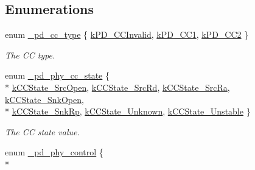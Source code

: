 \subsection*{Enumerations}
\begin{DoxyCompactItemize}
\item 
enum \hyperlink{group__usb__pd__phy__drv_gab23c0fba94b457218944bc5284d0d08d}{\-\_\-pd\-\_\-cc\-\_\-type} \{ \hyperlink{group__usb__pd__phy__drv_ggab23c0fba94b457218944bc5284d0d08da38c70fd9b523ca5666dea46ae65119ce}{k\-P\-D\-\_\-\-C\-C\-Invalid}, 
\hyperlink{group__usb__pd__phy__drv_ggab23c0fba94b457218944bc5284d0d08dad8ccec791609837bd7b2cb928ba727b6}{k\-P\-D\-\_\-\-C\-C1}, 
\hyperlink{group__usb__pd__phy__drv_ggab23c0fba94b457218944bc5284d0d08da274bd8ffe2629a7d89fb09b4848e172d}{k\-P\-D\-\_\-\-C\-C2}
 \}
\begin{DoxyCompactList}\small\item\em The C\-C type. \end{DoxyCompactList}\item 
enum \hyperlink{group__usb__pd__phy__drv_ga09172da56b484f99a2ee891e75882faa}{\-\_\-pd\-\_\-phy\-\_\-cc\-\_\-state} \{ \\*
\hyperlink{group__usb__pd__phy__drv_gga09172da56b484f99a2ee891e75882faaac26b04a9aef09cf82b2b01c5d775ad40}{k\-C\-C\-State\-\_\-\-Src\-Open}, 
\hyperlink{group__usb__pd__phy__drv_gga09172da56b484f99a2ee891e75882faaaa412476134fd446143c0e7275b5c329f}{k\-C\-C\-State\-\_\-\-Src\-Rd}, 
\hyperlink{group__usb__pd__phy__drv_gga09172da56b484f99a2ee891e75882faaab1f4f45b18f4f5729a23ef05ba9c741d}{k\-C\-C\-State\-\_\-\-Src\-Ra}, 
\hyperlink{group__usb__pd__phy__drv_gga09172da56b484f99a2ee891e75882faaa72b993ea12153a2594e24883bf82250e}{k\-C\-C\-State\-\_\-\-Snk\-Open}, 
\\*
\hyperlink{group__usb__pd__phy__drv_gga09172da56b484f99a2ee891e75882faaade47f2368d7c600c0c08f3e171116f47}{k\-C\-C\-State\-\_\-\-Snk\-Rp}, 
\hyperlink{group__usb__pd__phy__drv_gga09172da56b484f99a2ee891e75882faaad9c10479d9b8c3ead23386b15c857458}{k\-C\-C\-State\-\_\-\-Unknown}, 
\hyperlink{group__usb__pd__phy__drv_gga09172da56b484f99a2ee891e75882faaab679c126401ef34d37b0807109669dcf}{k\-C\-C\-State\-\_\-\-Unstable}
 \}
\begin{DoxyCompactList}\small\item\em The C\-C state value. \end{DoxyCompactList}\item 
enum \hyperlink{group__usb__pd__phy__drv_gab8bfca50e2ac042b47a697c88f84c3ed}{\-\_\-pd\-\_\-phy\-\_\-control} \{ \\*

\end{DoxyCompactItemize}
